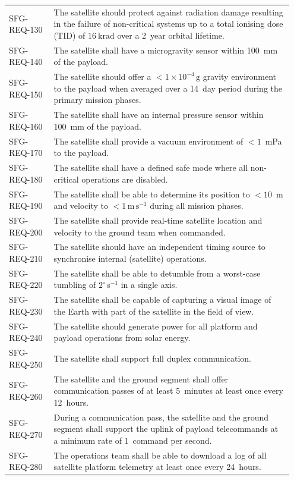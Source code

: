 \documentclass[a4paper, 11pt, conference]{IEEEtran}
\begin{document}
{\begin{longtable}{@{}p{0.15\linewidth}p{0.80\linewidth}@{}}
SFG-REQ-130 & The satellite should protect against radiation damage resulting in the failure of non-critical systems up to a total ionising dose (TID) of $16~\mathrm{krad}$ over a 2~year orbital lifetime. \\
SFG-REQ-140 & The satellite shall have a microgravity sensor within 100~mm of the payload. \\
SFG-REQ-150 & The satellite should offer a $< 1 \times 10^{-4}\,\mathrm{g}$ gravity environment to the payload when averaged over a 14~day period during the primary mission phases. \\
SFG-REQ-160 & The satellite shall have an internal pressure sensor within 100~mm of the payload. \\
SFG-REQ-170 & The satellite shall provide a vacuum environment of $< 1$~mPa to the payload. \\
SFG-REQ-180 & The satellite shall have a defined safe mode where all non-critical operations are disabled. \\
SFG-REQ-190 & The satellite shall be able to determine its position to $< 10$~m and velocity to $< 1\,\mathrm{m\,s}^{-1}$ during all mission phases. \\
SFG-REQ-200 & The satellite shall provide real-time satellite location and velocity to the ground team when commanded. \\
SFG-REQ-210 & The satellite should have an independent timing source to synchronise internal (satellite) operations. \\
SFG-REQ-220 & The satellite shall be able to detumble from a worst-case tumbling of $2^\circ$\,s$^{-1}$ in a single axis. \\
SFG-REQ-230 & The satellite shall be capable of capturing a visual image of the Earth with part of the satellite in the field of view. \\
SFG-REQ-240 & The satellite should generate power for all platform and payload operations from solar energy. \\
SFG-REQ-250 & The satellite shall support full duplex communication. \\
SFG-REQ-260 & The satellite and the ground segment shall offer communication passes of at least 5~minutes at least once every 12~hours. \\
SFG-REQ-270 & During a communication pass, the satellite and the ground segment shall support the uplink of payload telecommands at a minimum rate of 1~command per second. \\
SFG-REQ-280 & The operations team shall be able to download a log of all satellite platform telemetry at least once every 24~hours. \\

\end{longtable}}
\end{document}
